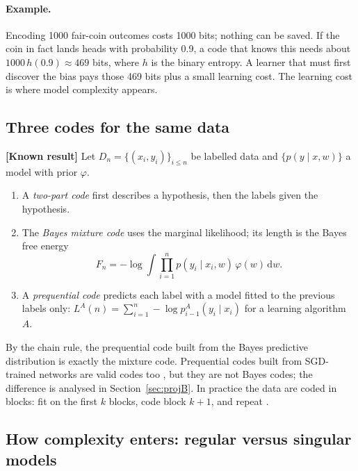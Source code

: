 \documentclass[11pt,a4paper]{article}
\newcommand{\dd}{\mathrm d}
\newcommand{\evl}[2]{{\small\bfseries\color{#1}[#2]}}
\newcommand{\LKnown}{\evl{cknown}{Known result}}
\begin{document}
\paragraph{Example.} Encoding 1000 fair-coin outcomes costs 1000 bits;
nothing can be saved. If the coin in fact lands heads with probability
0.9, a code that knows this needs about $1000\,h(0.9)\approx469$ bits,
where $h$ is the binary entropy. A learner that must first discover the
bias pays those 469 bits plus a small learning cost. The learning cost
is where model complexity appears.

\subsection{Three codes for the same data}

\LKnown{} Let $D_n=\{(x_i,y_i)\}_{i\le n}$ be labelled data and
$\{p(y\mid x,w)\}$ a model with prior $\varphi$.
\begin{enumerate}[leftmargin=*]
\item A \emph{two-part code} first describes a hypothesis, then the labels
given the hypothesis.
\item The \emph{Bayes mixture code} uses the marginal likelihood; its length
is the Bayes free energy
\begin{equation}
F_n=-\log\int\prod_{i=1}^n p(y_i\mid x_i,w)\,\varphi(w)\,\dd w .
\label{eq:freeenergy}
\end{equation}
\item A \emph{prequential code} \cite{dawid1984} predicts each label with a
model fitted to the previous labels only:
$L^A(n)=\sum_{i=1}^n-\log p^A_{i-1}(y_i\mid x_i)$ for a learning
algorithm $A$.
\end{enumerate}
By the chain rule, the prequential code built from the Bayes predictive
distribution is exactly the mixture code. Prequential codes built from
SGD-trained networks are valid codes too \cite{blierollivier2018}, but
they are not Bayes codes; the difference is analysed in
Section~\ref{sec:projB}. In practice the data are coded in blocks: fit
on the first $k$ blocks, code block $k+1$, and repeat
\cite{voita2020,blierollivier2018}.

\subsection{How complexity enters: regular versus singular models}
\end{document}
